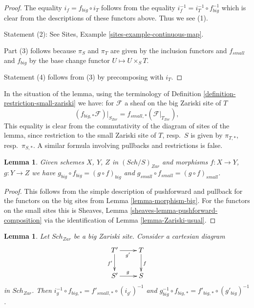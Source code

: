 \documentclass{stacks-project}
\theoremstyle{plain}
\newtheorem{lemma}[subsection]{Lemma}
\theoremstyle{definition}
\theoremstyle{remark}
\numberwithin{equation}{subsection}
\def\Sch{\mathit{Sch}}
\begin{document}
\begin{proof}
The equality $i_f = f_{big} \circ i_T$ follows from the
equality $i_f^{-1} = i_T^{-1} \circ f_{big}^{-1}$ which is
clear from the descriptions of these functors above.
Thus we see (1).

\medskip\noindent
Statement (2): See Sites, Example \ref{sites-example-continuous-map}.

\medskip\noindent
Part (3) follows because $\pi_S$ and $\pi_T$ are given by
the inclusion functors and $f_{small}$ and $f_{big}$ by the
base change functor $U \mapsto U \times_S T$.

\medskip\noindent
Statement (4) follows from (3) by precomposing with $i_T$.
\end{proof}

\noindent
In the situation of the lemma, using the terminology of
Definition \ref{definition-restriction-small-zariski}
we have: for $\mathcal{F}$ a sheaf on the big Zariski site of $T$
$$
(f_{big, *}\mathcal{F})|_{S_{Zar}} =
f_{small, *}(\mathcal{F}|_{T_{Zar}}),
$$
This equality is clear from the commutativity of the diagram of
sites of the lemma, since restriction to the small Zariski site of
$T$, resp.\ $S$ is given by $\pi_{T, *}$, resp.\ $\pi_{S, *}$. A similar
formula involving pullbacks and restrictions is false.

\begin{lemma}
\label{lemma-composition}
Given schemes $X$, $Y$, $Z$ in $(\Sch/S)_{Zar}$
and morphisms $f : X \to Y$, $g : Y \to Z$ we have
$g_{big} \circ f_{big} = (g \circ f)_{big}$ and
$g_{small} \circ f_{small} = (g \circ f)_{small}$.
\end{lemma}

\begin{proof}
This follows from the simple description of pushforward
and pullback for the functors on the big sites from
Lemma \ref{lemma-morphism-big}. For the functors
on the small sites this is
Sheaves, Lemma \ref{sheaves-lemma-pushforward-composition}
via the identification of Lemma \ref{lemma-Zariski-usual}.
\end{proof}

\begin{lemma}
\label{lemma-morphism-big-small-cartesian-diagram}
Let $\Sch_{Zar}$ be a big Zariski site. Consider a cartesian diagram
$$
\xymatrix{
T' \ar[r]_{g'} \ar[d]_{f'} & T \ar[d]^f \\
S' \ar[r]^g & S
}
$$
in $\Sch_{Zar}$. Then
$i_g^{-1} \circ f_{big, *} = f'_{small, *} \circ (i_{g'})^{-1}$
and $g_{big}^{-1} \circ f_{big, *} = f'_{big, *} \circ (g'_{big})^{-1}$.
\end{lemma}
\end{document}
